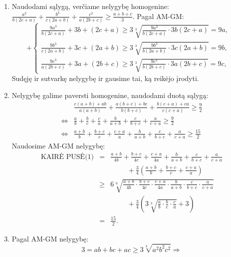 \begin{enumerate}
$$\begin{array}{ll}
\end{array}\right.$$ $\Rightarrow
S=\left(1+\frac{2a}{3b}\right)\left(1+\frac{2b}{3c}\right)\left(1+\frac{2c}{3d}\right)\left(1+\frac{2d}{3a}\right)\geq\frac{625}{81}\cdot\left(\frac{a}{b}\cdot\frac{b}{c}\cdot\frac{c}{d}\cdot\frac{d}{a}\right)^{\frac{2}{5}}=\frac{625}{81}.$
$S$ Minimumas yra $\frac{625}{81}$. Jis pasiekiamas, kai $a=b=c=d>0.$
\item 
Naudodami sąlygą, verčiame nelygybę homogenine:
$\frac{a^3}{b(2c+a)}+\frac{b^3}{c(2a+b)}+\frac{c^3}{a(2b+c)}\geq
\frac{a+b+c}{3}.$ Pagal AM-GM: $$+\left\{\begin{array}{ll}
\frac{9a^3}{b(2c+a)}+3b+(2c+a)\geq3\sqrt[3]{\frac{9a^3}{b(2c+a)}\cdot3b(2c+a)}=9a,&\\
\frac{9b^3}{c(2a+b)}+3c+(2a+b)\geq3\sqrt[3]{\frac{9b^3}{b(2a+b)}\cdot3c(2a+b)}=9b,&\\
\frac{9c^3}{a(2b+c)}+3a+(2b+c)\geq3\sqrt[3]{\frac{9c^3}{b(2b+c)}\cdot3a(2b+c)}=9c,&
\end{array}\right.$$ Sudęję ir sutvarkę nelygybę ir gausime tai, ką
reikėjo įrodyti.
\item 
Nelygybę galime paversti homogenine, naudodami duotą sąlygą:
\begin{align*}
&\frac{c(a+b)+ab}{a(a+b)}+\frac{a(b+c)+bc}{b(b+c)}+\frac{b(c+a)+ca}{c(c+a)}\geq\frac{9}{2}\\
\Leftrightarrow&\frac{a}{b}+\frac{b}{c}+\frac{c}{a}+\frac{b}{a+b}+\frac{c}{b+c}+\frac{a}{c+a}\geq\frac{9}{2}\\
\Leftrightarrow&\frac{a+b}{b}+\frac{b+c}{c}+\frac{c+a}{a}+\frac{b}{a+b}+\frac{c}{b+c}+\frac{a}{c+a}\geq\frac{15}{2}
\tag{1} \end{align*} Naudosime AM-GM nelygybę:
\begin{eqnarray*}\mbox{KAIRĖ PUSĖ(1)}
&=&\frac{a+b}{4b}+\frac{b+c}{4c}+\frac{c+a}{4a}+\frac{b}{a+b}+\frac{c}{b+c}+\frac{a}{c+a}\\
&&\hspace{1cm}+\frac{3}{4}\left(\frac{a+b}{b}+\frac{b+c}{c}+\frac{c+a}{a}\right)\\
&\geq&6\sqrt[6]{\frac{a+b}{4b}\cdot\frac{b+c}{4c}\cdot\frac{c+a}{4a}\cdot\frac{b}{a+b}\cdot\frac{c}{b+c}\cdot\frac{a}{c+a}}\\
&&\hspace{1cm}+\frac{3}{4}\left(3\sqrt[3]{\frac{a}{b}\cdot\frac{b}{c}\cdot\frac{c}{a}}+3\right)\\
&=&\frac{15}{2}. \end{eqnarray*}
\item 
Pagal AM-GM nelygybę: $$3=ab+bc+ac\geq3\sqrt[3]{a^2b^2c^2}\Rightarrow
$$
\end{enumerate}
